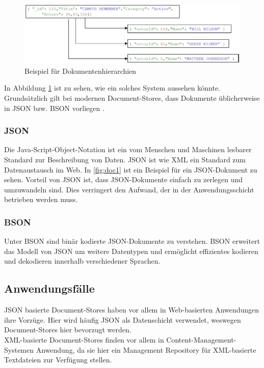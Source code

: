 \begin{figure}[H]
	\centering
	\includegraphics[scale=0.5]{images/docstores_3.jpg} 
	\caption{Beispiel für Dokumentenhierarchien}\label{fig:doc3}
\end{figure}
In Abbildung \ref{fig:doc3} ist zu sehen, wie ein solches System aussehen könnte. 
\\

Grundsätzlich gilt bei modernen Document-Stores, dass Dokumente üblicherweise in JSON bzw. BSON vorliegen \cite{harrison01}.

\subsubsection{JSON}
Die Java-Script-Object-Notation ist ein vom Menschen und Maschinen lesbarer Standard zur Beschreibung von Daten. JSON ist wie XML ein Standard zum Datenaustausch im Web.
In \ref{fig:doc1} ist ein Beispiel für ein JSON-Dokument zu sehen. Vorteil von JSON ist, dass JSON-Dokumente einfach zu zerlegen und umzuwandeln sind. Dies verringert den Aufwand, der in der Anwendungsschicht betrieben werden muss.
\subsubsection{BSON}
Unter BSON sind binär kodierte JSON-Dokumente zu verstehen. BSON erweitert das Modell von JSON um weitere Datentypen und ermöglicht effizientes kodieren und dekodieren innerhalb verschiedener Sprachen.
\subsection{Anwendungsfälle}
JSON basierte Document-Stores haben vor allem in Web-basierten Anwendungen ihre Vorzüge. Hier wird häufig JSON als Datenschicht verwendet, weswegen Document-Stores hier bevorzugt werden.
\\

XML-basierte Document-Stores finden vor allem in Content-Management-Systemen Anwendung, da sie hier ein Management Repository für XML-basierte Textdateien zur Verfügung stellen.
\\

